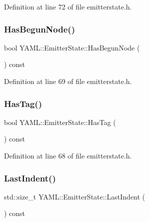 Definition at line 72 of file emitterstate.\+h.

\mbox{\label{class_y_a_m_l_1_1_emitter_state_ae9f170424ef31253ae8d41a347ae25d4}} 
\subsubsection{\texorpdfstring{HasBegunNode()}{HasBegunNode()}}
{\footnotesize\ttfamily bool Y\+A\+M\+L\+::\+Emitter\+State\+::\+Has\+Begun\+Node (\begin{DoxyParamCaption}{ }\end{DoxyParamCaption}) const\hspace{0.3cm}{\ttfamily [inline]}}



Definition at line 69 of file emitterstate.\+h.

\mbox{\label{class_y_a_m_l_1_1_emitter_state_a7b7d743cef490055b4a445f9c0eb1846}} 
\subsubsection{\texorpdfstring{HasTag()}{HasTag()}}
{\footnotesize\ttfamily bool Y\+A\+M\+L\+::\+Emitter\+State\+::\+Has\+Tag (\begin{DoxyParamCaption}{ }\end{DoxyParamCaption}) const\hspace{0.3cm}{\ttfamily [inline]}}



Definition at line 68 of file emitterstate.\+h.

\mbox{\label{class_y_a_m_l_1_1_emitter_state_ae2f04931df4f82cdde4785010c7a7823}} 
\subsubsection{\texorpdfstring{LastIndent()}{LastIndent()}}
{\footnotesize\ttfamily std\+::size\+\_\+t Y\+A\+M\+L\+::\+Emitter\+State\+::\+Last\+Indent (\begin{DoxyParamCaption}{ }\end{DoxyParamCaption}) const}



